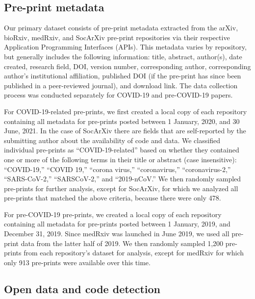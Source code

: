 \documentclass[
]{article}
\begin{document}
\hypertarget{pre-print-metadata}{%
\subsection{Pre-print metadata}\label{pre-print-metadata}}

Our primary dataset consists of pre-print metadata extracted from the arXiv, bioRxiv, medRxiv, and SocArXiv pre-print repositories via their respective Application Programming Interfaces (APIs). This metadata varies by repository, but generally includes the following information: title, abstract, author(s), date created, research field, DOI, version number, corresponding author, corresponding author's institutional affiliation, published DOI (if the pre-print has since been published in a peer-reviewed journal), and download link. The data collection process was conducted separately for COVID-19 and pre-COVID-19 papers.

For COVID-19-related pre-prints, we first created a local copy of each repository containing all metadata for pre-prints posted between 1 January, 2020, and 30 June, 2021. In the case of SocArXiv there are fields that are self-reported by the submitting author about the availability of code and data. We classified individual pre-prints as ``COVID-19-related'' based on whether they contained one or more of the following terms in their title or abstract (case insensitive): ``COVID-19,'' ``COVID 19,'' ``corona virus,'' ``coronavirus,'' ``coronavirus-2,'' ``SARS-CoV-2,'' ``SARSCoV-2,'' and ``2019-nCoV.'' We then randomly sampled pre-prints for further analysis, except for SocArXiv, for which we analyzed all pre-prints that matched the above criteria, because there were only 478.

For pre-COVID-19 pre-prints, we created a local copy of each repository containing all metadata for pre-prints posted between 1 January, 2019, and December 31, 2019. Since medRxiv was launched in June 2019, we used all pre-print data from the latter half of 2019. We then randomly sampled 1,200 pre-prints from each repository's dataset for analysis, except for medRxiv for which only 913 pre-prints were available over this time.

\hypertarget{open-data-and-code-detection}{%
\subsection{Open data and code detection}\label{open-data-and-code-detection}}
\end{document}
